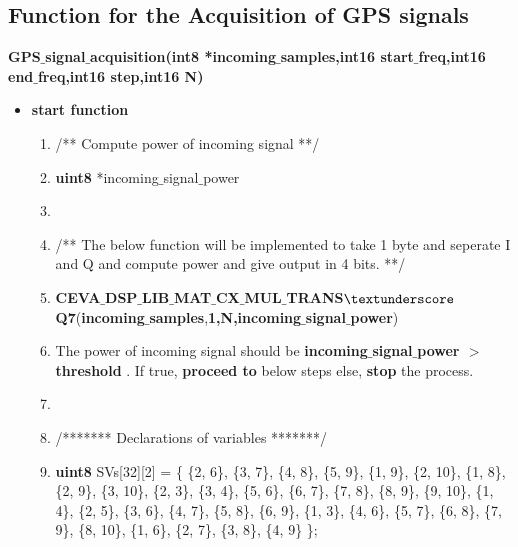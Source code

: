 \documentclass[journal,10pt,onecolumn]{article}
\begin{document}
\subsection*{Function for the Acquisition of GPS signals}

\textbf{GPS$\_$signal$\_$acquisition(int8 *incoming$\_$samples,int16 start$\_$freq,int16 end$\_$freq,int16 step,int16 N)}
\begin{itemize}
\item[] \textbf{start function}
\begin{enumerate}
    \item[] /** Compute power of incoming signal **/
    \item[] \textbf{uint8} *incoming$\_$signal$\_$power
    \item[]
    \item[] /** The below function will be implemented  to take 1 byte and seperate I and Q and compute power and give output in 4 bits. **/
    \item[] \textbf{CEVA$\_$DSP$\_$LIB$\_$MAT$\_$CX$\_$MUL$\_$TRANS$\textunderscore$Q7}(\textbf{incoming$\_$samples},\textbf{1,N,incoming$\_$signal$\_$power}) 
    \item[]  The power of incoming signal should be \textbf{ incoming$\_$signal$\_$power $>$ threshold} . If true, \textbf{proceed to} below steps else, \textbf{stop} the process.
    \item[]
    \item[] /******* Declarations of variables *******/
    \item[] \textbf{uint8} SVs[32][2] = \{
        \{2, 6\},
        \{3, 7\},
        \{4, 8\},
        \{5, 9\},
        \{1, 9\},
        \{2, 10\},
        \{1, 8\},
        \{2, 9\},
        \{3, 10\},
        \{2, 3\},
        \{3, 4\},
        \{5, 6\},
        \{6, 7\},
        \{7, 8\},
        \{8, 9\},
        \{9, 10\},
        \{1, 4\},
        \{2, 5\},
        \{3, 6\},
        \{4, 7\},
        \{5, 8\}, 
        \{6, 9\},
        \{1, 3\},
        \{4, 6\},
        \{5, 7\}, 
        \{6, 8\},
        \{7, 9\},
        \{8, 10\},
        \{1, 6\},
        \{2, 7\},
        \{3, 8\},
        \{4, 9\}
    \};
     

\end{enumerate}
\end{itemize}
\end{document}
